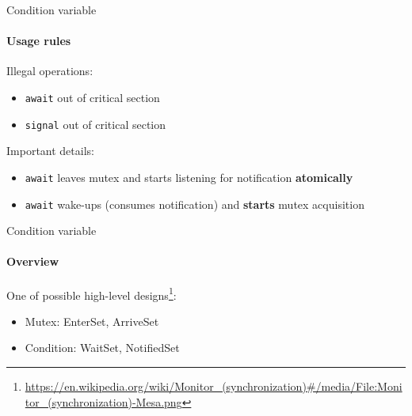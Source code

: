 \begin{frame}[fragile]{Condition variable}
\framesubtitle{Usage rules}

Illegal operations:
\begin{itemize}
    \item \texttt{await} out of critical section
    \item \texttt{signal} out of critical section
\end{itemize}

Important details:
\begin{itemize}
    \item \texttt{await} leaves mutex and starts listening for notification \textbf{atomically}
    \item \texttt{await} wake-ups (consumes notification) and \textbf{starts} mutex acquisition
\end{itemize}
\end{frame}

\begin{frame}{Condition variable}
\framesubtitle{Overview}
One of possible high-level designs\footnote{\tiny\url{https://en.wikipedia.org/wiki/Monitor_(synchronization)#/media/File:Monitor_(synchronization)-Mesa.png}}:
\begin{itemize}
    \item Mutex: EnterSet, ArriveSet
    \item Condition: WaitSet, NotifiedSet
\end{itemize}


\end{frame}

